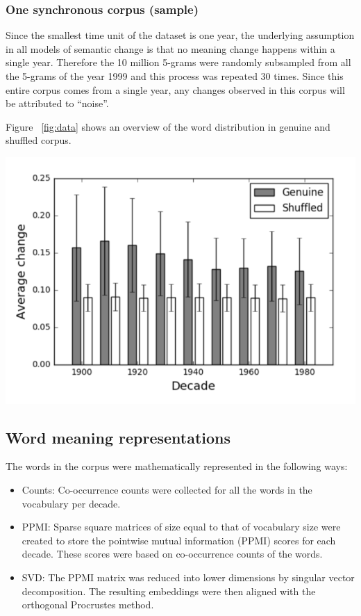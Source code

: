 \documentclass[a0,landscape]{a0poster}
\begin{document}
\begin{multicols}{4}
\subsubsection*{ One synchronous corpus (sample)}
Since the smallest time unit of the dataset is one year, the underlying assumption in all models of semantic change is that no meaning change happens within a single year. Therefore the 10 million 5-grams were randomly subsampled from all the 5-grams of the year 1999 and this process was repeated 30 times. Since this entire corpus comes from a single year, any changes observed in this corpus will be attributed to “noise”.

Figure ~\ref{fig:data} shows an overview of the word distribution in  genuine and shuffled corpus.

\begin{center}\vspace{1cm}
  \includegraphics[width=0.8\linewidth]{image3.png}
  \label{fig:data}
\end{center}\vspace{1cm}

\subsection*{Word meaning representations} 
The words in the corpus were mathematically represented in the following ways:
\begin{itemize}
  \item Counts: Co-occurrence counts were collected for all the words in the vocabulary per decade.
  \item PPMI: Sparse square matrices of size equal to that of vocabulary size were created to store the pointwise mutual information (PPMI) scores for each decade. These scores were based on co-occurrence counts of the words.
  \item SVD: The PPMI matrix was reduced into lower dimensions by singular vector decomposition. The resulting embeddings were then aligned with the orthogonal Procrustes method.
\end{itemize}


\end{multicols}
\end{document}
